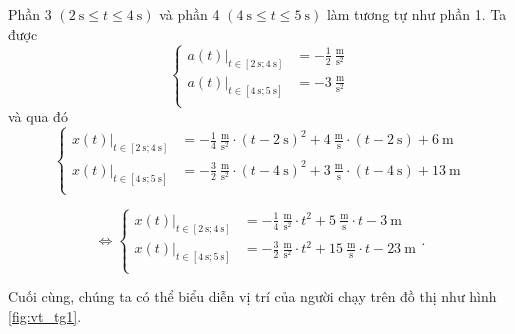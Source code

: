 \documentclass[a4paper, titlepage, openany]{book}
\numberwithin{equation}{chapter}
\begin{document}
Phần 3 $\left(2\ \text{s}\leq t \leq 4\ \text{s}\right)$ và phần 4 $\left(4\ \text{s}\leq t \leq 5\ \text{s}\right)$ làm tương tự như phần 1. Ta được
\begin{equation*}
   \begin{cases}
     \left.a(t)\right|_{t\in\left[2\ \text{s};4\ \text{s}\right]} &= -\frac{1}{2}\ \frac{\text{m}}{\text{s}^2}\\
     \left.a(t)\right|_{t\in\left[4\ \text{s};5\ \text{s}\right]} &= -3\ \frac{\text{m}}{\text{s}^2}\\
   \end{cases}
\end{equation*}
và qua đó
\begin{equation*}
   \begin{cases}
     \left.x(t)\right|_{t\in\left[2\ \text{s};4\ \text{s}\right]} &= -\frac{1}{4}\ \frac{\text{m}}{\text{s}^2}\cdot\left(t - 2\ \text{s}\right)^2 + 4\ \frac{\text{m}}{\text{s}}\cdot \left(t - 2\ \text{s}\right) + 6\ \text{m}\\
     \left.x(t)\right|_{t\in\left[4\ \text{s};5\ \text{s}\right]} &= -\frac{3}{2}\ \frac{\text{m}}{\text{s}^2}\cdot\left(t - 4\ \text{s}\right)^2 + 3\ \frac{\text{m}}{\text{s}}\cdot \left(t - 4\ \text{s}\right) + 13\ \text{m}\\
   \end{cases}
\end{equation*}

\begin{equation*}
         \iff
   \begin{cases}
     \left.x(t)\right|_{t\in\left[2\ \text{s};4\ \text{s}\right]} &= -\frac{1}{4}\ \frac{\text{m}}{\text{s}^2}\cdot t^2 + 5\ \frac{\text{m}}{\text{s}}\cdot t - 3\ \text{m}\\
     \left.x(t)\right|_{t\in\left[4\ \text{s};5\ \text{s}\right]} &= -\frac{3}{2}\ \frac{\text{m}}{\text{s}^2}\cdot t^2 + 15\ \frac{\text{m}}{\text{s}}\cdot t - 23\ \text{m}\\
   \end{cases}.
\end{equation*}

Cuối cùng, chúng ta có thể biểu diễn vị trí của người chạy trên đồ thị như hình \ref{fig:vt_tg1}.
\end{document}
